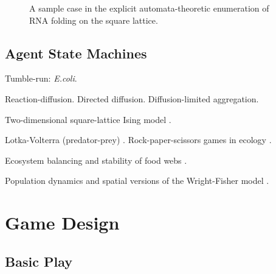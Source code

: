 \documentclass{acm_proc_article-sp}
\begin{document}
\begin{figure}
\caption{
\label{fig:rna}
A sample case in the explicit automata-theoretic enumeration of RNA folding on the square lattice.
}
\end{figure}

\subsection{Agent State Machines}

Tumble-run: {\em E.coli}.
\cite{RosserEtAl2013}


Reaction-diffusion.
Directed diffusion.
Diffusion-limited aggregation.
\cite{DLA}

Two-dimensional square-lattice Ising model \cite{Onsager1944}.

Lotka-Volterra (predator-prey) \cite{LotkaVolterra,SpatialLotkaVolterra}.
Rock-paper-scissors games in ecology \cite{Tainaka2000}.

Ecosystem balancing and stability of food webs \cite{quince2005topological}.

Population dynamics and spatial versions of the Wright-Fisher model \cite{MathiesonMcVean2013}.

\section{Game Design}

\subsection{Basic Play}
\end{document}
